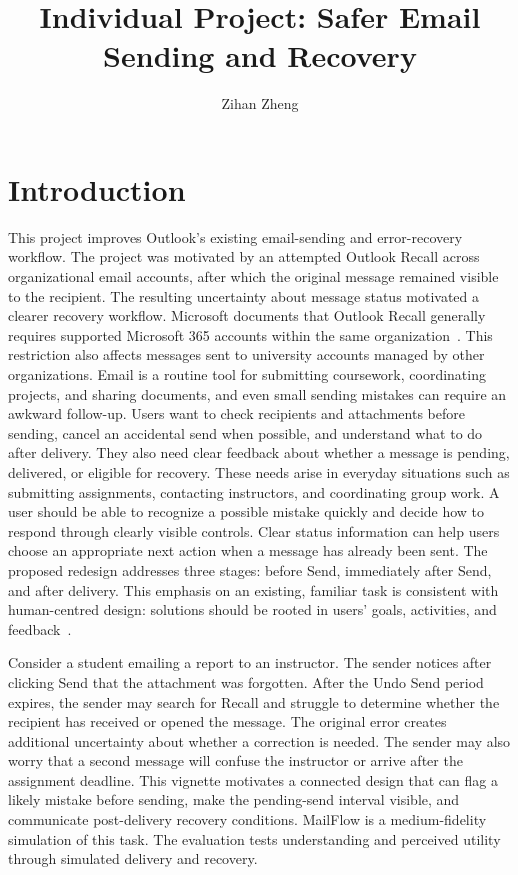 \documentclass[letterpaper]{jdf}
\author{Zihan Zheng}
\title{Individual Project: Safer Email Sending and Recovery}
\begin{document}
\maketitle
\egroup %
\section{Introduction}
This project improves Outlook's existing email-sending and error-recovery workflow. The project was motivated by an attempted Outlook Recall across organizational email accounts, after which the original message remained visible to the recipient. The resulting uncertainty about message status motivated a clearer recovery workflow. Microsoft documents that Outlook Recall generally requires supported Microsoft 365 accounts within the same organization~\citep{microsoft-recall}. This restriction also affects messages sent to university accounts managed by other organizations. Email is a routine tool for submitting coursework, coordinating projects, and sharing documents, and even small sending mistakes can require an awkward follow-up. Users want to check recipients and attachments before sending, cancel an accidental send when possible, and understand what to do after delivery. They also need clear feedback about whether a message is pending, delivered, or eligible for recovery. These needs arise in everyday situations such as submitting assignments, contacting instructors, and coordinating group work. A user should be able to recognize a possible mistake quickly and decide how to respond through clearly visible controls. Clear status information can help users choose an appropriate next action when a message has already been sent. The proposed redesign addresses three stages: before Send, immediately after Send, and after delivery. This emphasis on an existing, familiar task is consistent with human-centred design: solutions should be rooted in users' goals, activities, and feedback~\citep{iso-hcd}.

Consider a student emailing a report to an instructor. The sender notices after clicking Send that the attachment was forgotten. After the Undo Send period expires, the sender may search for Recall and struggle to determine whether the recipient has received or opened the message. The original error creates additional uncertainty about whether a correction is needed. The sender may also worry that a second message will confuse the instructor or arrive after the assignment deadline. This vignette motivates a connected design that can flag a likely mistake before sending, make the pending-send interval visible, and communicate post-delivery recovery conditions. MailFlow is a medium-fidelity simulation of this task. The evaluation tests understanding and perceived utility through simulated delivery and recovery.
\end{document}
